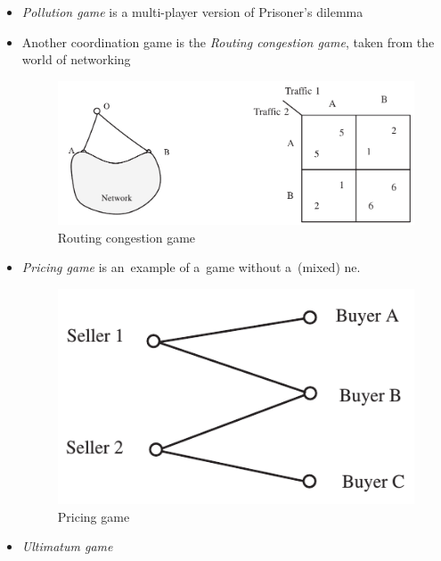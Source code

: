 \begin{itemize}
  \item \emph{Pollution game} is a multi-player version of Prisoner's dilemma \todo

  \item Another coordination game is the \emph{Routing congestion game}, taken from the world of networking

    \begin{figure}[H]
      \centering
      \includegraphics[width=0.65\paperwidth]{../img/routing-congestion-game.png}
      \caption{Routing congestion game}
      \label{fig:routing-congestion}
    \end{figure}

  \item \emph{Pricing game} is an~example of a~game without a~(mixed) \acrshort{ne}.

    \begin{figure}[H]
      \centering
      \includegraphics[width=\figurewidthratio\paperwidth]{../img/pricing-game.png}
      \caption{Pricing game}
      \label{fig:pricing-game}
    \end{figure}

  \item \emph{Ultimatum game}
\end{itemize}

